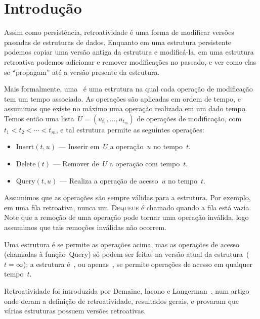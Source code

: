 \documentclass[../../main.tex]{subfiles}
\begin{document}
\chapter*{Introdução}

Assim como persistência, retroatividade é uma forma de modificar versões passadas de estruturas de dados. Enquanto em uma estrutura persistente podemos copiar uma versão antiga da estrutura e modificá-la, em uma estrutura retroativa podemos adicionar e remover modificações no passado, e ver como elas se ``propagam'' até a versão presente da estrutura.

Mais formalmente, uma~ é uma estrutura na qual cada operação de modificação tem um tempo associado. As operações são aplicadas em ordem de tempo, e assumimos que existe no máximo uma operação realizada em um dado tempo. Temos então uma lista~${U = (u_{t_1}, \ldots, u_{t_m})}$ de operações de modificação, com~${t_1 < t_2 < \cdots < t_m}$, e tal estrutura permite as seguintes operações:

\begin{itemize}
	\item $\text{Insert}(t, u)$ --- Inserir em~$U$ a operação~$u$ no tempo~$t$.
	\item $\text{Delete}(t)$ --- Remover de~$U$ a operação com tempo~$t$.
	\item $\text{Query}(t, u)$ --- Realiza a operação de acesso~$u$ no tempo~$t$.
\end{itemize}

Assumimos que as operações são sempre válidas para a estrutura. Por exemplo, em uma fila retroativa, nunca um~\textsc{Dequeue} é chamado quando a fila está vazia. Note que a remoção de uma operação pode tornar uma operação inválida, logo assumimos que tais remoções inválidas não ocorrem.

Uma estrutura é  se permite as operações acima, mas as operações de acesso (chamadas à função~Query) só podem ser feitas na versão atual da estrutura~(${t = \infty}$); a estrutura é~, ou apenas~, se permite operações de acesso em qualquer tempo~$t$.

Retroatividade foi introduzida por Demaine, Iacono e Langerman~\cite{DemaineIL2007}, num artigo onde deram a definição de retroatividade, resultados gerais, e provaram que várias estruturas possuem versões retroativas.
\end{document}
